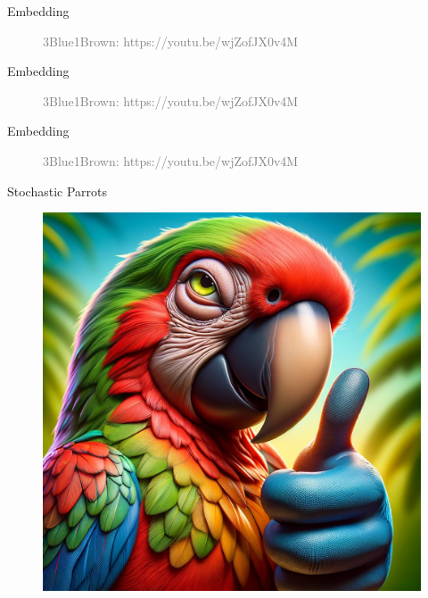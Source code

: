 \documentclass{beamer}
\begin{document}
\begin{frame}{Embedding}
    \begin{figure}
        \centering
        \caption*{\textcolor{gray}{3Blue1Brown: https://youtu.be/wjZofJX0v4M}}
    \end{figure}
\end{frame}

\begin{frame}{Embedding}
    \begin{figure}
        \centering
        \caption*{\textcolor{gray}{3Blue1Brown: https://youtu.be/wjZofJX0v4M}}
    \end{figure}
\end{frame}

\begin{frame}{Embedding}
    \begin{figure}
        \centering
        \caption*{\textcolor{gray}{3Blue1Brown: https://youtu.be/wjZofJX0v4M}}
    \end{figure}
\end{frame}

\begin{frame}{Stochastic Parrots}
    \begin{figure}
        \includegraphics[width=.7\linewidth]{imgs/parrot/parrot.png}
    \end{figure}
\end{frame}
\end{document}
